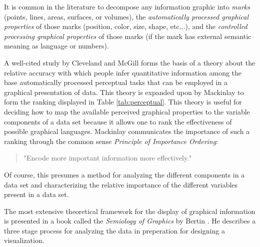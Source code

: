 It is common in the literature to decompose any information graphic into \emph{marks} (points, lines, areas, surfaces, or volumes), the \emph{automatically processed graphical properties} of those marks (position, color, size, shape, etc...), and the \emph{controlled processing graphical properties} of those marks (if the mark has external semantic meaning as language or numbers). 

A well-cited study by Cleveland and McGill \cite{cleveland1984} forms the basis of a theory about the relative accuracy with which people infer quantitative information among the base automatically processed perceptual tasks that can be employed in a graphical presentation of data. This theory is expanded upon by Mackinlay \cite{jock1986} to form the ranking displayed in Table \ref{tab:perceptual}. This theory is useful for deciding how to map the available perceived graphical properties to the variable components of a data set because it allows one to rank the effectiveness of possible graphical languages. Mackinlay communicates the importance of such a ranking through the common sense \emph{Principle of Importance Ordering}:

\begin{quote}
"Encode more important information more effectively." \cite{jock1986}
\end{quote}

\begin{comment}
The Structure of the Information Visualization Design Space, Section 2 
controlled vs. automatic processing
connection

Visual Information Seeking: Tight Coupling of Dynamic Query Filters with Starfield Displays
\end{comment}

Of course, this presumes a method for analyzing the different components in a data set and characterizing the relative importance of the different variables present in a data set.

The most extensive theoretical framework for the display of graphical information is presented in a book called the \emph{Semiology of Graphics} by Bertin \cite{semiology1983}. He describes a three stage process for analyzing the data in preperation for designing a visualization.

